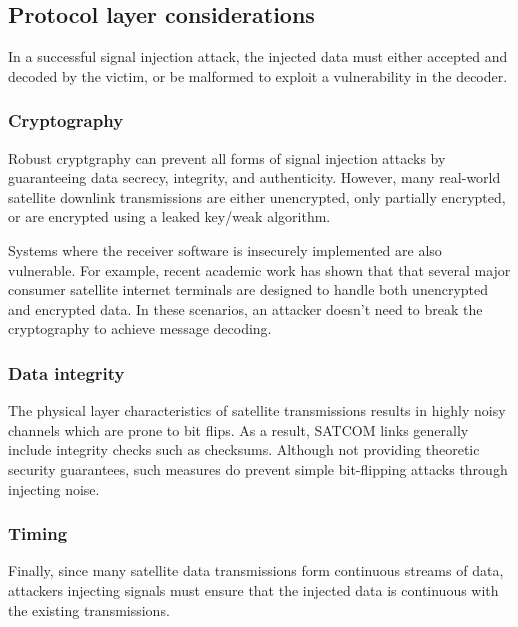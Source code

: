 \subsection{Protocol layer considerations}


In a successful signal injection attack, the injected data must either accepted and decoded by the victim, or be malformed to exploit a vulnerability in the decoder.

\subsubsection{Cryptography}

Robust cryptgraphy can prevent all forms of signal injection attacks by guaranteeing data secrecy, integrity, and authenticity.
However, many real-world satellite downlink transmissions are either unencrypted, only partially encrypted, or are encrypted using a leaked key/weak algorithm.

Systems where the receiver software is insecurely implemented are also vulnerable.
For example, recent academic work has shown that that several major consumer satellite internet terminals are designed to handle both unencrypted and encrypted data.
In these scenarios, an attacker doesn't need to break the cryptography to achieve message decoding.

\subsubsection{Data integrity}

The physical layer characteristics of satellite transmissions results in highly noisy channels which are prone to bit flips.
As a result, SATCOM links generally include integrity checks such as checksums.
Although not providing theoretic security guarantees, such measures do prevent simple bit-flipping attacks through injecting noise.

\subsubsection{Timing}

Finally, since many satellite data transmissions form continuous streams of data, attackers injecting signals must ensure that the injected data is continuous with the existing transmissions.

